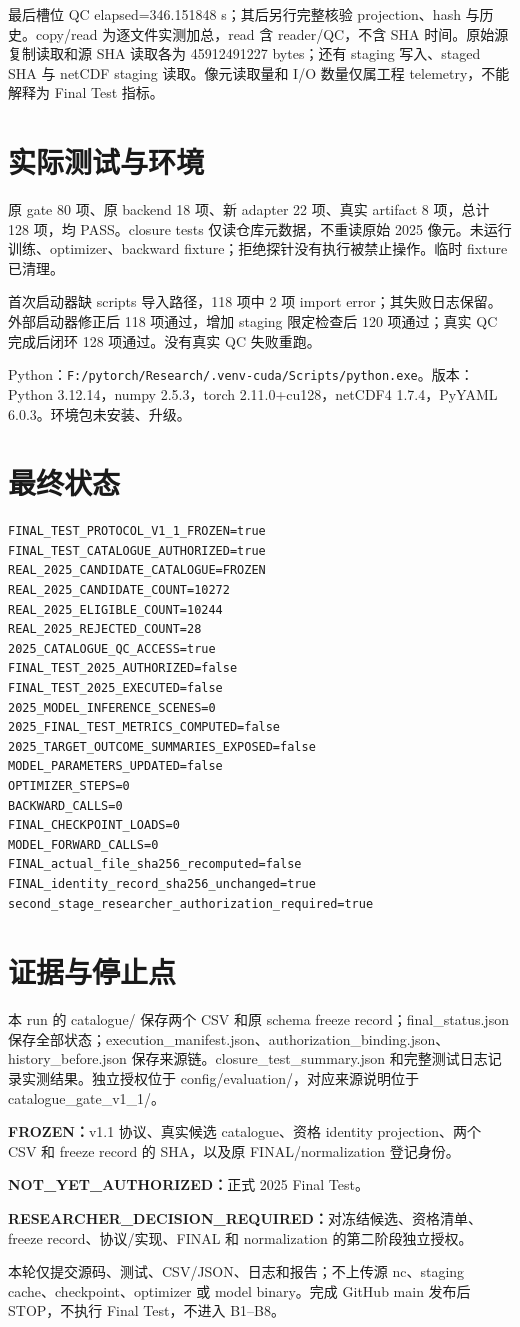 \documentclass[UTF8,11pt,a4paper,fontset=windows]{ctexart}
\begin{document}
最后槽位 QC elapsed=346.151848 s；其后另行完整核验 projection、hash 与历史。copy/read 为逐文件实测加总，read 含 reader/QC，不含 SHA 时间。原始源复制读取和源 SHA 读取各为 45912491227 bytes；还有 staging 写入、staged SHA 与 netCDF staging 读取。像元读取量和 I/O 数量仅属工程 telemetry，不能解释为 Final Test 指标。

\section*{实际测试与环境}
原 gate 80 项、原 backend 18 项、新 adapter 22 项、真实 artifact 8 项，总计 128 项，均 PASS。closure tests 仅读仓库元数据，不重读原始 2025 像元。未运行训练、optimizer、backward fixture；拒绝探针没有执行被禁止操作。临时 fixture 已清理。

首次启动器缺 scripts 导入路径，118 项中 2 项 import error；其失败日志保留。外部启动器修正后 118 项通过，增加 staging 限定检查后 120 项通过；真实 QC 完成后闭环 128 项通过。没有真实 QC 失败重跑。

Python：\texttt{F:/pytorch/Research/.venv-cuda/Scripts/python.exe}。版本：Python 3.12.14，numpy 2.5.3，torch 2.11.0+cu128，netCDF4 1.7.4，PyYAML 6.0.3。环境包未安装、升级。
\newpage
\section*{最终状态}
{\footnotesize\begin{verbatim}
FINAL_TEST_PROTOCOL_V1_1_FROZEN=true
FINAL_TEST_CATALOGUE_AUTHORIZED=true
REAL_2025_CANDIDATE_CATALOGUE=FROZEN
REAL_2025_CANDIDATE_COUNT=10272
REAL_2025_ELIGIBLE_COUNT=10244
REAL_2025_REJECTED_COUNT=28
2025_CATALOGUE_QC_ACCESS=true
FINAL_TEST_2025_AUTHORIZED=false
FINAL_TEST_2025_EXECUTED=false
2025_MODEL_INFERENCE_SCENES=0
2025_FINAL_TEST_METRICS_COMPUTED=false
2025_TARGET_OUTCOME_SUMMARIES_EXPOSED=false
MODEL_PARAMETERS_UPDATED=false
OPTIMIZER_STEPS=0
BACKWARD_CALLS=0
FINAL_CHECKPOINT_LOADS=0
MODEL_FORWARD_CALLS=0
FINAL_actual_file_sha256_recomputed=false
FINAL_identity_record_sha256_unchanged=true
second_stage_researcher_authorization_required=true
\end{verbatim}}
\section*{证据与停止点}
本 run 的 catalogue/ 保存两个 CSV 和原 schema freeze record；final\_status.json 保存全部状态；execution\_manifest.json、authorization\_binding.json、history\_before.json 保存来源链。closure\_test\_summary.json 和完整测试日志记录实测结果。独立授权位于 config/evaluation/，对应来源说明位于 catalogue\_gate\_v1\_1/。

\textbf{FROZEN：}v1.1 协议、真实候选 catalogue、资格 identity projection、两个 CSV 和 freeze record 的 SHA，以及原 FINAL/normalization 登记身份。

\textbf{NOT\_YET\_AUTHORIZED：}正式 2025 Final Test。

\textbf{RESEARCHER\_DECISION\_REQUIRED：}对冻结候选、资格清单、freeze record、协议/实现、FINAL 和 normalization 的第二阶段独立授权。

本轮仅提交源码、测试、CSV/JSON、日志和报告；不上传源 nc、staging cache、checkpoint、optimizer 或 model binary。完成 GitHub main 发布后 STOP，不执行 Final Test，不进入 B1--B8。
\end{document}
